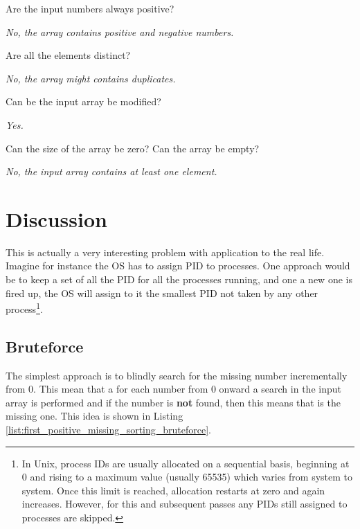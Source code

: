 \begin{QandA}
	\item Are the input numbers always positive?
	\begin{answered}
		\textit{No, the array contains positive and negative numbers.}
	\end{answered}

	\item Are all the elements distinct?
	\begin{answered}
		\textit{No, the array might contains duplicates.}
	\end{answered}
	
	\item Can be the input array be modified?
	\begin{answered}
		\textit{Yes.}
	\end{answered}

	\item Can the size of the array be zero? Can the array be empty?
	\begin{answered}
		\textit{No, the input array contains at least one element.}
	\end{answered}

\end{QandA}

\section{Discussion}
\label{first_positive_missing:sec:discussion}
This is actually a very interesting problem with application to the real life. Imagine for instance the OS has to assign PID to processes. One approach would be to keep a set of all the PID for all the processes running, and one a new one is fired up, the OS will assign to it the smallest PID not taken by any other process\footnote{In Unix, process IDs are usually allocated on a sequential basis, beginning at 0 and rising to a maximum value (usually 65535) which varies from system to system. Once this limit is reached, allocation restarts at zero and again increases. However, for this and subsequent passes any PIDs still assigned to processes are skipped.}.

\subsection{Bruteforce}
The simplest approach is to blindly search for the missing number incrementally from $0$. This mean that a for each number from $0$ onward a search in the input array is performed and if the number is \textbf{not} found, then this means that is the missing one. This idea is shown in Listing \ref{list:first_positive_missing_sorting_bruteforce}.

